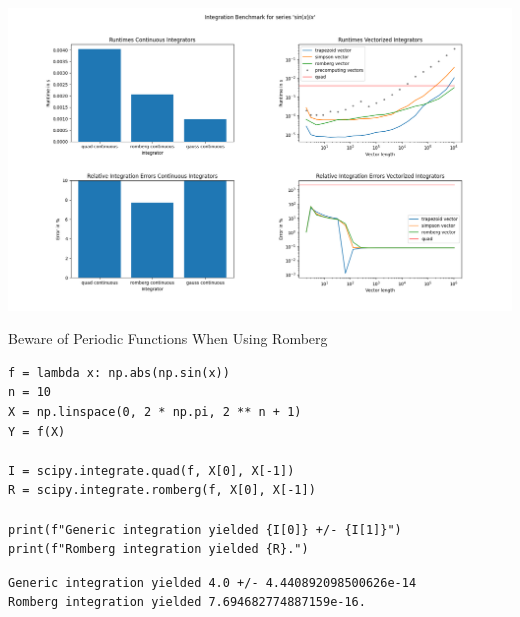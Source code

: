 \begin{frame}
%
\begin{center}
\includegraphics[width=\linewidth]{./gfx/06-timedints-3}
\end{center}
%
\end{frame}


\begin{frame}[fragile]{Beware of Periodic Functions When Using Romberg}
%
\begin{codebox}
\begin{verbatim}
f = lambda x: np.abs(np.sin(x))
n = 10
X = np.linspace(0, 2 * np.pi, 2 ** n + 1)
Y = f(X)

I = scipy.integrate.quad(f, X[0], X[-1])
R = scipy.integrate.romberg(f, X[0], X[-1])

print(f"Generic integration yielded {I[0]} +/- {I[1]}")
print(f"Romberg integration yielded {R}.")
\end{verbatim}
\end{codebox}
%
\begin{cmdbox}
\begin{verbatim}
Generic integration yielded 4.0 +/- 4.440892098500626e-14
Romberg integration yielded 7.694682774887159e-16.
\end{verbatim}
\end{cmdbox}
%
\end{frame}


